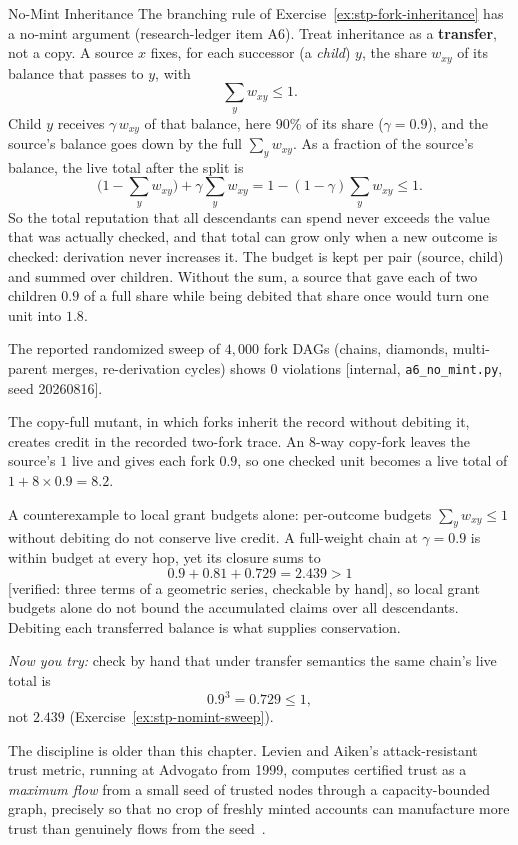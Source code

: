 \documentclass[11pt,a4paper]{article}
\theoremstyle{definition}
\begin{document}
\begin{pdexample}{No-Mint Inheritance}
\setlength{\parskip}{4pt plus 1pt}
The branching rule of Exercise~\ref{ex:stp-fork-inheritance} has a
no-mint argument (research-ledger item A6). Treat inheritance as a
\textbf{transfer}, not a copy. A source $x$ fixes, for each successor (a
\emph{child}) $y$, the share $w_{xy}$ of its balance that passes to $y$, with
\[
\textstyle\sum_y w_{xy}\le 1 .
\]
Child $y$ receives $\gamma\,w_{xy}$ of that balance, here 90\% of its share
($\gamma=0.9$), and the source's balance goes down by the full
$\sum_y w_{xy}$. As a fraction of the source's balance, the live total after
the split is
\[
\textstyle\bigl(1-\sum_y w_{xy}\bigr)+\gamma\sum_y w_{xy}
=1-(1-\gamma)\sum_y w_{xy}\le 1 .
\]
So the total reputation that all descendants can spend never exceeds the
value that was actually checked, and that total can grow only when a new
outcome is checked: derivation never increases it. The budget is kept per
pair (source, child) and summed over children. Without the sum, a source that
gave each of two children $0.9$ of a full share while being debited that share
once would turn one unit into $1.8$.

The reported randomized sweep of $4{,}000$
fork DAGs (chains, diamonds, multi-parent merges, re-derivation cycles) shows
$0$ violations [internal, \texttt{a6\_no\_mint.py}, seed 20260816].

The copy-full mutant, in which forks inherit the record without debiting it,
creates credit in the recorded two-fork trace. An 8-way copy-fork leaves the
source's $1$ live and gives each fork $0.9$, so one checked unit becomes a live
total of $1+8\times0.9=8.2$.

A counterexample to local grant budgets alone:
per-outcome budgets $\sum_y w_{xy} \le 1$ without debiting do not conserve live
credit. A full-weight chain at $\gamma=0.9$ is within budget at every hop, yet
its closure sums to
\[
0.9+0.81+0.729=2.439>1
\]
[verified: three terms of a geometric series, checkable
by hand], so local grant budgets alone do not bound the accumulated claims over all
descendants. Debiting each transferred balance is what supplies conservation.

\emph{Now you try:} check by hand
that under transfer semantics the same chain's live total is
\[
0.9^3=0.729\le 1,
\]
not $2.439$ (Exercise~\ref{ex:stp-nomint-sweep}).

The discipline is older than this chapter. Levien and Aiken's attack-resistant trust metric, running at
Advogato from 1999, computes certified trust as a \emph{maximum flow} from a
small seed of trusted nodes through a capacity-bounded graph, precisely so
that no crop of freshly minted accounts can manufacture more trust than
genuinely flows from the seed~.


\end{pdexample}
\end{document}
